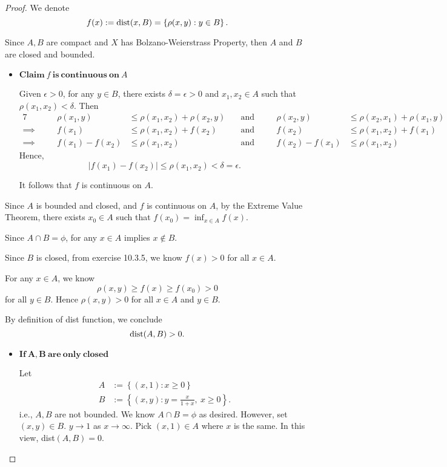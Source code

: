 \begin{Exercise}
\begin{proof}
We denote 
$$
f(x) 
:= {\rm dist}(x,B) 
= \left\{\rho(x,y):y\in B\right\}.
$$

Since $A,B$ are compact and $X$ has Bolzano-Weierstrass Property, then $A$ and $B$ are closed and bounded.
\begin{itemize}
\item $\mathbf{Claim\ \mathit{f}\ is\ continuous\ on\ \mathit{A}}$

Given $\epsilon>0$, for any $y\in B$, there exists $\delta = \epsilon > 0$ and $x_1, x_2\in A$ such that $\rho(x_1,x_2) < \delta$. Then 
\begin{alignat*}{7}
\quad&& \rho(x_1,y) &\leq \rho(x_1,x_2) + \rho(x_2, y)\quad&\text{and}\quad&& \rho(x_2,y) &\leq \rho(x_2,x_1) + \rho(x_1, y)  \\
\implies\quad&& f(x_1) &\leq \rho(x_1,x_2) + f(x_2)\quad&\text{and}\quad&& f(x_2) &\leq \rho(x_1,x_2) + f(x_1) \\
\implies\quad&& f(x_1)-f(x_2) &\leq \rho(x_1,x_2) \quad&\text{and}\quad&& f(x_2)-f(x_1) &\leq \rho(x_1,x_2)
\end{alignat*}
Hence,
$$
\left| f(x_1)-f(x_2) \right| \leq \rho(x_1, x_2) < \delta = \epsilon.
$$

It follows that $f$ is continuous on $A$.
\end{itemize}

Since $A$ is bounded and closed, and $f$ is continuous on $A$, by the Extreme Value Theorem, there exists $x_0\in A$ such that $f(x_0)=\inf_{x\in A}f(x)$.

Since $A\cap B = \phi$, for any $x\in A$ implies $x\notin B$. 

Since $B$ is closed, from exercise 10.3.5, we know $f(x) > 0$ for all $x\in A$. 

For any $x\in A$, we know
$$
\rho(x,y)
\geq f(x)
\geq f(x_0)
> 0
$$
for all $y\in B$. Hence $\rho(x,y) > 0$ for all $x\in A$ and $y\in B$. 

By definition of dist function, we conclude
$$
{\rm dist}(A,B) > 0.
$$

\begin{itemize}
\item $\mathbf{If\ A,B\ are\ only\ closed}$

Let
\begin{align*}
A &:= \left\{(x,1):x\geq 0\right\} \\
B &:= \left\{(x,y):y=\frac{x}{1+x},\ x\geq 0\right\}.
\end{align*}
i.e., $A,B$ are not bounded. We know $A\cap B=\phi$ as desired. However, set $(x, y) \in B$. $y\to 1$ as $x\to\infty$. Pick $(x, 1)\in A$ where $x$ is the same. In this view, dist$(A,B)=0$.
\end{itemize}
\end{proof}
\end{Exercise}